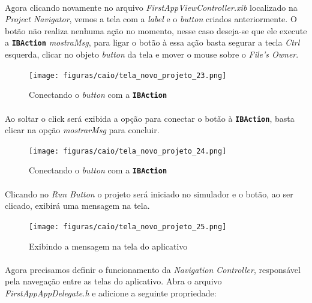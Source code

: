 \documentclass[a4paper,12pt,brazil,doubleside]{book}
\begin{document}
\begin{singlespace}
\paragraph{}Agora clicando novamente no arquivo \emph{FirstAppViewController.xib} localizado na \emph{Project Navigator}, vemos a tela com a \emph{label} e o \emph{button} criados anteriormente. O botão não realiza nenhuma ação no momento, nesse caso deseja-se que ele execute a \texttt{\textbf{IBAction}} \emph{mostraMsg}, para ligar o botão à essa ação basta segurar a tecla \emph{Ctrl} esquerda, clicar no objeto \emph{button} da tela e mover o mouse sobre o \emph{File's Owner}.

\begin{figure}[H]
  \centering
  \texttt{[image: figuras/caio/tela\_novo\_projeto\_23.png]}
  \caption{Conectando o \emph{button} com a \texttt{\textbf{IBAction}}}
  \label{fig:a}
\end{figure}

\paragraph{}Ao soltar o click será exibida a opção para conectar o botão à \texttt{\textbf{IBAction}}, basta clicar na opção \emph{mostrarMsg} para concluir.

\begin{figure}[H]
  \centering
  \texttt{[image: figuras/caio/tela\_novo\_projeto\_24.png]}
  \caption{Conectando o \emph{button} com a \texttt{\textbf{IBAction}}}
  \label{fig:a}
\end{figure}

\paragraph{}Clicando no \emph{Run Button} o projeto será iniciado no simulador e o botão, ao ser clicado, exibirá uma mensagem na tela.

\begin{figure}[H]
  \centering
  \texttt{[image: figuras/caio/tela\_novo\_projeto\_25.png]}
  \caption{Exibindo a mensagem na tela do aplicativo}
  \label{fig:a}
\end{figure}

\paragraph{}Agora precisamos definir o funcionamento da \emph{Navigation Controller}, responsável pela navegação entre as telas do aplicativo. Abra o arquivo \emph{FirstAppAppDelegate.h} e adicione a seguinte propriedade:


\end{singlespace}
\end{document}
